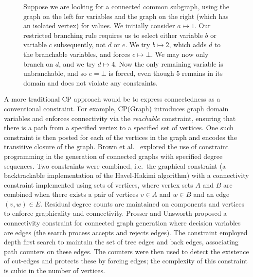 \documentclass{llncs}
\begin{document}
\begin{figure}[tb]

    \caption{Suppose we are looking for a connected common subgraph, using the graph on the left
        for variables and the graph on the right (which has an isolated vertex) for values. We
        initially consider $a \mapsto 1$. Our restricted branching rule requires us to select either variable
        $b$ or variable $c$ subsequently, not $d$ or $e$. We try $b \mapsto 2$, which adds $d$
        to the branchable variables, and forces $c \mapsto \bot$. We may now only branch on $d$, and
        we try $d \mapsto 4$. Now the only remaining variable is unbranchable, and so $e = \bot$ is forced, even
        though $5$ remains in its domain and does not violate any constraints.}\label{figure:restricted}
\end{figure}

A more traditional CP approach would be to express connectedness as a conventional constraint. For
example, CP(Graph) \cite{DBLP:conf/cp/DoomsDD05} introduces graph domain variables and enforces
connectivity via the \emph{reachable} constraint, ensuring that there is a path from a specified
vertex to a specified set of vertices. One such constraint is then posted for each of the vertices
in the graph and encodes the transitive closure of the graph. Brown et al.\ \cite{Brown:2005}
explored the use of constraint programming in the generation of connected graphs with specified
degree sequences.  Two constraints were combined, i.e.\ the graphical constraint (a backtrackable
implementation of the Havel-Hakimi algorithm) with a connectivity constraint implemented using sets
of vertices, where vertex sets $A$ and $B$ are combined when there exists a pair of vertices $v \in
A$ and $w \in B$ and an edge $(v,w) \in E$. Residual degree counts are maintained on components and
vertices to enforce graphicality and connectivity. Prosser and Unsworth
\cite{DBLP:conf/ecai/ProsserU06} proposed a connectivity constraint for connected graph generation
where decision variables are edges (the search process accepts and rejects edges). The constraint
employed depth first search to maintain the set of tree edges and back edges, associating path
counters on these edges. The counters were then used to detect the existence of cut-edges and
protects these by forcing edges; the complexity of this constraint is cubic in the number of
vertices.
\end{document}

